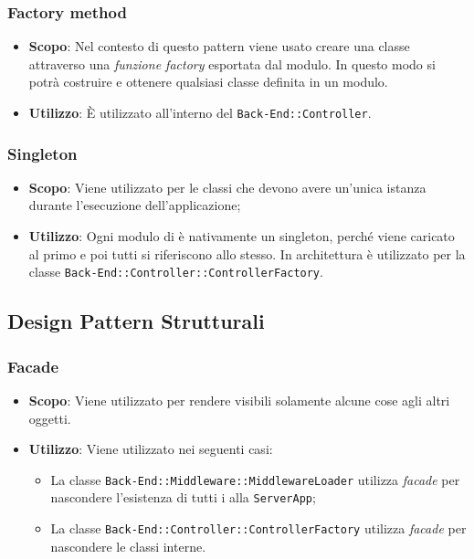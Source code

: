 \subsubsection{Factory method}

\begin{itemize}

	\item \textbf{Scopo}: Nel contesto di  questo pattern viene usato creare una classe attraverso una \textit{funzione factory} esportata dal modulo. In questo modo si potrà costruire e ottenere qualsiasi classe definita in un modulo.
	\item \textbf{Utilizzo}: È utilizzato all'interno del  \texttt{Back-End::Controller}.

\end{itemize}

\subsubsection{Singleton}

\begin{itemize}

	\item \textbf{Scopo}: Viene utilizzato per le classi che devono avere un'unica istanza durante l'esecuzione dell'applicazione;
	\item \textbf{Utilizzo}: Ogni modulo di  è nativamente un singleton, perché viene caricato al primo  e poi tutti si riferiscono allo stesso. In architettura è utilizzato per la classe \texttt{Back-End::Controller::ControllerFactory}.

\end{itemize}

\subsection{Design Pattern Strutturali}

\subsubsection{Facade}

\begin{itemize}

	\item \textbf{Scopo}: Viene utilizzato per rendere visibili solamente alcune cose agli altri oggetti.
	\item \textbf{Utilizzo}: Viene utilizzato nei seguenti casi:
	\begin{itemize}
	
		\item La classe \texttt{Back-End::Middleware::MiddlewareLoader} utilizza \textit{facade} per nascondere l'esistenza di tutti i  alla \texttt{ServerApp};
		\item La classe \texttt{Back-End::Controller::ControllerFactory} utilizza \textit{facade} per nascondere le classi interne.
		
	\end{itemize}
\end{itemize}

